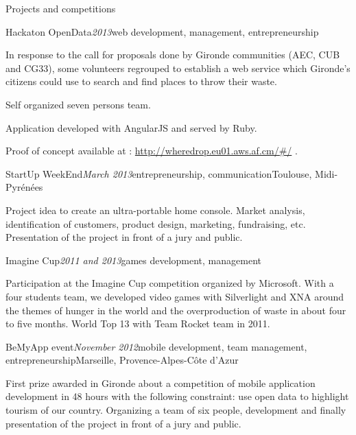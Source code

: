 \begin{rSection}{Projects and competitions}
  \begin{rSubsection}{Hackaton OpenData}{\em 2013}{web development, management, entrepreneurship}{}
    \item[] In response to the call for proposals done by Gironde communities (AEC, CUB and CG33), some volunteers regrouped to establish a web service which Gironde's citizens could use to search and find places to throw their waste.
    \item Self organized seven persons team.
    \item Application developed with AngularJS and served by Ruby.
    \item Proof of concept available at : \href{http://wheredrop.eu01.aws.af.cm/#/}{http://wheredrop.eu01.aws.af.cm/\#/} .
  \end{rSubsection}

  \begin{rSubsection}{StartUp WeekEnd}{\em March 2013}{entrepreneurship, communication}{Toulouse, Midi-Pyr\'{e}n\'{e}es}
    \item[] Project idea to create an ultra-portable home console. Market analysis, identification of customers, product design, marketing, fundraising, etc. Presentation of the project in front of a jury and public.
  \end{rSubsection}

  \begin{rSubsection}{Imagine Cup}{\em 2011 and 2013}{games development, management}{}
    \item[] Participation at the Imagine Cup competition organized by Microsoft. With a four students team, we developed video games with Silverlight and XNA around the themes of hunger in the world and the overproduction of waste in about four to five months. World Top 13 with Team Rocket team in 2011.
  \end{rSubsection}

  \begin{rSubsection}{BeMyApp event}{\em November 2012}{mobile development, team management, entrepreneurship}{Marseille, Provence-Alpes-C\^{o}te d'Azur}
    \item[] First prize awarded in Gironde about a competition of mobile application development in 48 hours with the following constraint: use open data to highlight tourism of our country. Organizing a team of six people, development and finally presentation of the project in front of a jury and public.
  \end{rSubsection}

\end{rSection}
